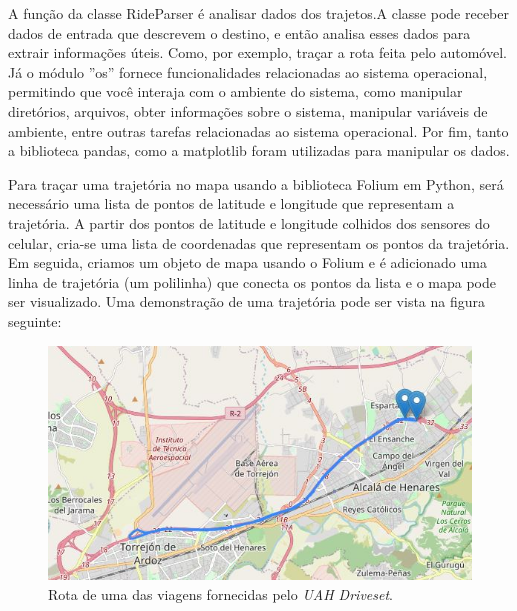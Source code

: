 A função da classe RideParser é analisar dados dos trajetos.A classe pode receber dados de entrada que descrevem o destino, e então analisa esses dados para extrair informações úteis. Como, por exemplo, traçar a rota feita pelo automóvel. Já o módulo 
''os'' fornece funcionalidades relacionadas ao sistema operacional, permitindo que você interaja com o ambiente do sistema, como manipular diretórios, arquivos, obter informações sobre o sistema, manipular variáveis de ambiente, entre outras tarefas relacionadas ao sistema operacional.
Por fim, tanto a biblioteca pandas, como a matplotlib foram utilizadas para manipular os dados.

Para traçar uma trajetória no mapa usando a biblioteca Folium em Python, será necessário uma lista de pontos de latitude e longitude que representam a trajetória. A partir dos pontos de latitude e longitude colhidos dos sensores do celular, cria-se uma lista de coordenadas que representam os pontos da trajetória. Em seguida, criamos um objeto de mapa usando o Folium e é adicionado uma linha de trajetória (um polilinha) que conecta os pontos da lista e o mapa pode ser visualizado. Uma demonstração de uma trajetória pode ser vista na figura seguinte:


\begin{figure}[hp]
    \centering
    
    \includegraphics[scale=0.8]{figures/rota_1.jpg}
    
    \caption{Rota de uma das viagens fornecidas pelo \textit{UAH Driveset}.}
    
    \label{fig:car_route_1}
\end{figure}





